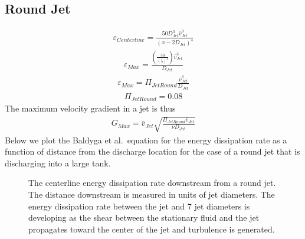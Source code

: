 \documentclass[letterpaper,10pt,english]{sphinxmanual}
\let\sphinxpxdimen\pdfpxdimen\else\newdimen\sphinxpxdimen
\begin{document}
\subsection{Round Jet}
\label{\detokenize{Rapid_Mix/RM_Derivations:round-jet}}\label{\detokenize{Rapid_Mix/RM_Derivations:heading-round-jet}}
\begin{equation}\label{equation:Rapid_Mix/RM_Derivations:Rapid_Mix/RM_Derivations:115}
\begin{split}\varepsilon_{Centerline} = \frac{50 D_{Jet}^3 \bar v_{Jet}^3}{ \left( x - 2 D_{Jet} \right)^4}\end{split}
\end{equation}\begin{equation}\label{equation:Rapid_Mix/RM_Derivations:Rapid_Mix/RM_Derivations:116}
\begin{split}\varepsilon_{Max} = \frac{\left( \frac{50}{\left( 5 \right)^4} \right) \bar v_{Jet}^3}{D_{Jet}}\end{split}
\end{equation}\begin{equation}\label{equation:Rapid_Mix/RM_Derivations:Rapid_Mix/RM_Derivations:117}
\begin{split}\varepsilon_{Max} = \Pi_{JetRound} \frac{\bar v_{Jet} ^3}{D_{Jet}}\end{split}
\end{equation}\begin{equation}\label{equation:Rapid_Mix/RM_Derivations:Rapid_Mix/RM_Derivations:118}
\begin{split}\Pi_{JetRound} = 0.08\end{split}
\end{equation}
The maximum velocity gradient in a jet is thus
\begin{equation}\label{equation:Rapid_Mix/RM_Derivations:Rapid_Mix/RM_Derivations:119}
\begin{split}G_{Max} = \bar v_{Jet} \sqrt{\frac{\Pi_{JetRound} \bar v_{Jet} }{\nu D_{Jet}}}\end{split}
\end{equation}
Below we plot the Baldyga et al. equation for the energy dissipation rate as a function of distance from the discharge location for the case of a round jet that is discharging into a large tank.

\begin{figure}[htbp]
\centering
\capstart

\noindent\sphinxincludegraphics[width=400\sphinxpxdimen]{{Jet_centerline_EDR}.png}
\caption{The centerline energy dissipation rate downstream from a round jet. The distance downstream is measured in units of jet diameters. The energy dissipation rate between the jet and 7 jet diameters is developing as the shear between the stationary fluid and the jet propagates toward the center of the jet and turbulence is generated.}\label{\detokenize{Rapid_Mix/RM_Derivations:id9}}\label{\detokenize{Rapid_Mix/RM_Derivations:figure-jet-centerline-edr}}\end{figure}
\end{document}
